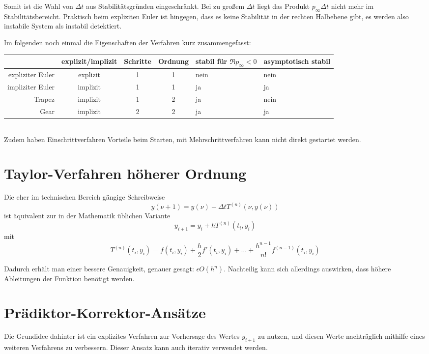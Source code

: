 Somit ist die Wahl von $\Delta t$ aus Stabilitätsgründen eingeschränkt. Bei zu großem $\Delta t$ liegt das Produkt $p_\infty \Delta t$ nicht mehr im Stabilitätsbereicht. Praktisch beim expliziten Euler ist hingegen, dass es keine Stabilität in der rechten Halbebene gibt, es werden also instabile System als instabil detektiert.

Im folgenden noch einmal die Eigenschaften der Verfahren kurz zusammengefasst:

\begin{tabular}{r|c|c|c|p{2.2cm}|p{2.3cm}}
& explizit/implizit & Schritte & Ordnung & stabil für $\Re{p_\infty} < 0$ & asymptotisch stabil \\ \hline
expliziter Euler & explizit & 1 & 1 & nein & nein \\ \hline
impliziter Euler & implizit & 1 & 1 & ja & ja \\ \hline
Trapez & implizit & 1 & 2 & ja & nein \\ \hline
Gear & implizit & 2 & 2 & ja & ja
\end{tabular} \hfill \\
Zudem haben Einschrittverfahren Vorteile beim Starten, mit Mehrschrittverfahren kann nicht direkt gestartet werden.

\section{Taylor-Verfahren höherer Ordnung}
Die eher im technischen Bereich gängige Schreibweise
\begin{equation}
y(\nu + 1) = y(\nu) + \Delta t T^{(n)}(\nu, y(\nu))
\end{equation}
ist äquivalent zur in der Mathematik üblichen Variante
\begin{equation}
y_{i + 1} = y_i + h T^{(n)} (t_i, y_i)
\end{equation}
mit
\begin{equation}
T^{(n)}(t_i, y_i) = f(t_i, y_i) + \frac{h}{2} f'(t_i, y_i) + \dots + \frac{h^{n - 1}}{n!} f^{(n - 1)}(t_i, y_i)
\end{equation}

Dadurch erhält man einer bessere Genauigkeit, genauer gesagt: $\epsilon O(h^n)$. Nachteilig kann sich allerdings auswirken, dass höhere Ableitungen der Funktion benötigt werden.

\section{Prädiktor-Korrektor-Ansätze}
Die Grundidee dahinter ist ein explizites Verfahren zur Vorhersage des Wertes $y_{i + 1}$ zu nutzen, und diesen Werte nachträglich mithilfe eines weiteren Verfahrens zu verbessern. Dieser Ansatz kann auch iterativ verwendet werden.

